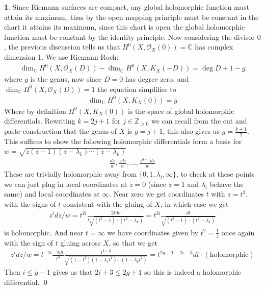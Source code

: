 \documentclass[10.5pt]{article}
\theoremstyle{definition}
\newtheorem{pb}{}
\newcommand{\set}[1]{\{#1\}}
\begin{document}
    \begin{pb}
        Since Riemann surfaces are compact, any global holomorphic function must attain its maximum, thus by the open mapping principle must be constant in the chart it attains its maximum, since this chart is open the global holomorphic function must be constant by the identity principle. Now considering the divisor \(0\), the previous discussion tells us that \(H^0(X,\mathcal{O}_X(0)) = \mathbb{C}\) has complex dimension 1. We use Riemann Roch:
        \begin{align}
            \dim_\mathbb{C}H^0(X,\mathcal{O}_X(D)) - \dim_\mathbb{C}H^0(X,K_X(-D)) = \deg D + 1 - g
        \end{align}
        where \(g\) is the genus, now since \(D = 0\) has degree zero, and \(\dim_\mathbb{C}H^0(X,\mathcal{O}_X(D)) = 1\) the equation simplifies to
        \begin{align}
            \dim_\mathbb{C}H^0(X,K_X(0)) = g
        \end{align}
        Where by definition \(H^0(X,K_X(0))\) is the space of global holomorphic differentials. Rewriting \(k = 2j + 1\) for \(j \in \mathbb{Z}_{\geq 0}\) we can recall from the cut and paste construction that the genus of \(X\) is \(g = j+1\), this also gives us \(g = \frac{k+1}{2}\). This suffices to show the following holomorphic differentials form a basis for \(w = \sqrt{z(z-1)(z-\lambda_1)\cdots(z-\lambda_{k})}\)
        \begin{align}
            \frac{dz}{w}, \frac{zdz}{w}, \hdots, \frac{z^{g-1}dz}{{w}}
        \end{align}
        These are trivially holomorphic away from \(\set{0,1,\lambda_i,\infty}\), to check at these points we can just plug in local coordinates at \(z = 0\) (since \(z = 1\) and \(\lambda_i\) behave the same) and local coordinates at \(\infty\). Near zero we get coordinates \(t\) with \(z = t^2\), with the signs of \(t\) consistent with the gluing of \(X\), in which case we get
        \begin{align}
            z^i dz/w = t^{2i} \frac{2tdt}{t\sqrt{(t^2 - 1)\cdots(t^2 - \lambda_k)}} = t^{2i} \frac{dt}{\sqrt{(t^2 - 1)\cdots(t^2 - \lambda_k)}}
        \end{align}
        is holomorphic. And near \(t = \infty\) we have coordinates given by \(t^2 = \frac{1}{z}\) once again with the sign of \(t\) gluing across \(X\), so that we get
        \begin{align}
            z^i dz/w = t^{-2i}\frac{-2dt}{t^3} \frac{t^{k+2}}{\sqrt{(1-t^2)(1-\lambda_1t^2)\cdots(1-\lambda_k t^2)}} = t^{2g + 1 - 2i - 3} dt \cdot (\text{holomorphic})
        \end{align}
        Then \(i \leq g-1\) gives us that \(2i + 3 \leq 2g+1\) so this is indeed a holomorphic differential. \qed
    \end{pb}
\end{document}
